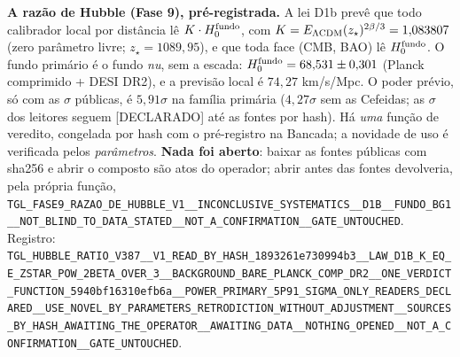 \documentclass[11pt]{article}
\theoremstyle{definition}\newtheorem{deriv}{Derivação}
\begin{document}
\textbf{A razão de Hubble (Fase 9), pré-registrada.} A lei D1b prevê que todo calibrador local por distância lê $K\cdot H_0^{\rm fundo}$, com $K=E_{\Lambda\rm CDM}(z_\star)^{2\beta/3}=1{,}083807$ (zero parâmetro livre; $z_\star=1089{,}95$), e que toda face (CMB, BAO) lê $H_0^{\rm fundo}$. O fundo primário é o fundo \emph{nu}, sem a escada: $H_0^{\rm fundo}=68{,}531\pm0{,}301$ (Planck comprimido + DESI DR2), e a previsão local é $74{,}27$ km/s/Mpc. O poder prévio, só com as $\sigma$ públicas, é $5{,}91\sigma$ na família primária ($4{,}27\sigma$ sem as Cefeidas; as $\sigma$ dos leitores seguem \textsf{[DECLARADO]} até as fontes por hash). Há \emph{uma} função de veredito, congelada por hash com o pré-registro na Bancada; a novidade de uso é verificada pelos \emph{parâmetros}. \textbf{Nada foi aberto}: baixar as fontes públicas com sha256 e abrir o composto são atos do operador; abrir antes das fontes devolveria, pela própria função, \texttt{TGL\_\allowbreak{}FASE9\_\allowbreak{}RAZAO\_\allowbreak{}DE\_\allowbreak{}HUBBLE\_\allowbreak{}V1\_\allowbreak{}\_\allowbreak{}INCONCLUSIVE\_\allowbreak{}SYSTEMATICS\_\allowbreak{}\_\allowbreak{}D1B\_\allowbreak{}\_\allowbreak{}FUNDO\_\allowbreak{}BG1\_\allowbreak{}\_\allowbreak{}NOT\_\allowbreak{}BLIND\_\allowbreak{}TO\_\allowbreak{}DATA\_\allowbreak{}STATED\_\allowbreak{}\_\allowbreak{}NOT\_\allowbreak{}A\_\allowbreak{}CONFIRMATION\_\allowbreak{}\_\allowbreak{}GATE\_\allowbreak{}UNTOUCHED}. Registro: \texttt{TGL\_\allowbreak{}HUBBLE\_\allowbreak{}RATIO\_\allowbreak{}V387\_\allowbreak{}\_\allowbreak{}V1\_\allowbreak{}READ\_\allowbreak{}BY\_\allowbreak{}HASH\_\allowbreak{}1893261e730994b3\_\allowbreak{}\_\allowbreak{}LAW\_\allowbreak{}D1B\_\allowbreak{}K\_\allowbreak{}EQ\_\allowbreak{}E\_\allowbreak{}ZSTAR\_\allowbreak{}POW\_\allowbreak{}2BETA\_\allowbreak{}OVER\_\allowbreak{}3\_\allowbreak{}\_\allowbreak{}BACKGROUND\_\allowbreak{}BARE\_\allowbreak{}PLANCK\_\allowbreak{}COMP\_\allowbreak{}DR2\_\allowbreak{}\_\allowbreak{}ONE\_\allowbreak{}VERDICT\_\allowbreak{}FUNCTION\_\allowbreak{}5940bf16310efb6a\_\allowbreak{}\_\allowbreak{}POWER\_\allowbreak{}PRIMARY\_\allowbreak{}5P91\_\allowbreak{}SIGMA\_\allowbreak{}ONLY\_\allowbreak{}READERS\_\allowbreak{}DECLARED\_\allowbreak{}\_\allowbreak{}USE\_\allowbreak{}NOVEL\_\allowbreak{}BY\_\allowbreak{}PARAMETERS\_\allowbreak{}RETRODICTION\_\allowbreak{}WITHOUT\_\allowbreak{}ADJUSTMENT\_\allowbreak{}\_\allowbreak{}SOURCES\_\allowbreak{}BY\_\allowbreak{}HASH\_\allowbreak{}AWAITING\_\allowbreak{}THE\_\allowbreak{}OPERATOR\_\allowbreak{}\_\allowbreak{}AWAITING\_\allowbreak{}DATA\_\allowbreak{}\_\allowbreak{}NOTHING\_\allowbreak{}OPENED\_\allowbreak{}\_\allowbreak{}NOT\_\allowbreak{}A\_\allowbreak{}CONFIRMATION\_\allowbreak{}\_\allowbreak{}GATE\_\allowbreak{}UNTOUCHED}.
\end{document}
